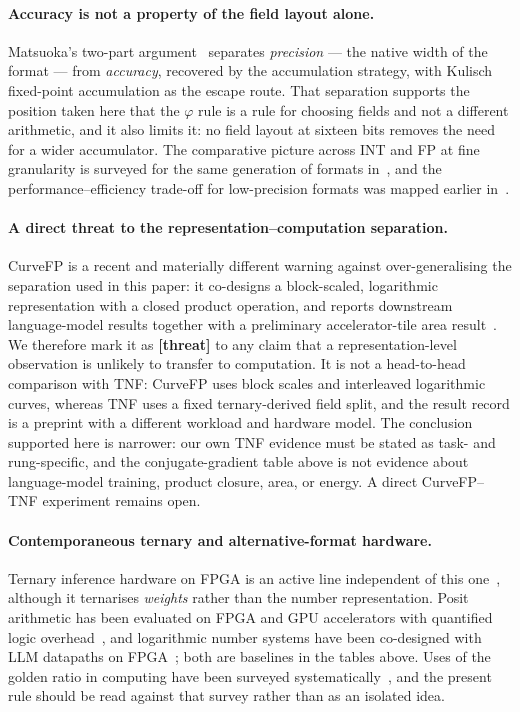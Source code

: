\paragraph{Accuracy is not a property of the field layout alone.} Matsuoka's
two-part argument~\cite{matsuoka2026fp8a,matsuoka2026fp8b} separates
\emph{precision} --- the native width of the format --- from \emph{accuracy},
recovered by the accumulation strategy, with Kulisch fixed-point accumulation as
the escape route. That separation supports the position taken here that the
$\varphi$ rule is a rule for choosing fields and not a different arithmetic, and
it also limits it: no field layout at sixteen bits removes the need for a wider
accumulator. The comparative picture across INT and FP at fine granularity is
surveyed for the same generation of formats in~\cite{int_vs_fp2025}, and the
performance--efficiency trade-off for low-precision formats was mapped
earlier in~\cite{mlformats}.

\paragraph{A direct threat to the representation--computation separation.}
CurveFP is a recent and materially different warning against over-generalising
the separation used in this paper: it co-designs a block-scaled,
logarithmic representation with a closed product operation, and reports
downstream language-model results together with a preliminary accelerator-tile
area result~\cite{qiao2026curvefp}. We therefore mark it as
\textbf{[threat]} to any claim that a representation-level observation is
unlikely to transfer to computation. It is not a head-to-head comparison with
TNF: CurveFP uses block scales and interleaved logarithmic curves, whereas TNF
uses a fixed ternary-derived field split, and the result record is a preprint
with a different workload and hardware model. The conclusion supported here is
narrower: our own TNF evidence must be stated as task- and rung-specific, and
the conjugate-gradient table above is not evidence about language-model
training, product closure, area, or energy. A direct CurveFP--TNF experiment
remains open.

\paragraph{Contemporaneous ternary and alternative-format hardware.} Ternary
inference hardware on FPGA is an active line independent of this
one~\cite{tereffic2025,tenet2025}, although it ternarises \emph{weights} rather
than the number representation. Posit arithmetic has been evaluated on FPGA and
GPU accelerators with quantified logic overhead~\cite{posit_accel2024}, and
logarithmic number systems have been co-designed with LLM datapaths on
FPGA~\cite{pnnl_lns2025}; both are baselines in the tables above. Uses of the
golden ratio in computing have been surveyed
systematically~\cite{akhtaruzzaman2024phi}, and the present rule should be read
against that survey rather than as an isolated idea.


